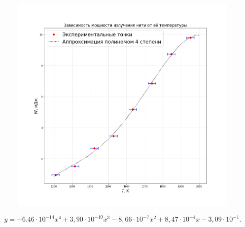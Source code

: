 \documentclass[a4paper,12pt]{article}
\begin{document}
\begin{figure}[H]\label{fig: W(T)}
    \centering
    \includegraphics[width = \textwidth]{W(T).png}
\end{figure}
\[y = -6.46\cdot 10^{-14} x^4 + 3,90\cdot 10^{-10} x^3 - 8,66\cdot 10^{-7} x^2 + 8,47\cdot 10^{-4} x  - 3,09\cdot 10^{-1}.\]
\end{document}
